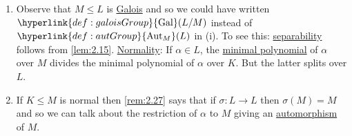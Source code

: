 \documentclass{article}
\DeclareMathOperator{\Aut}{Aut}
\DeclareMathOperator{\Gal}{Gal}
\begin{document}
\begin{remark}\leavevmode
    \begin{enumerate}[label=(\roman*)]
        \item Observe that $M \leq L$ is \hyperlink{def:galoisExt}{Galois} and so we could have written $\hyperlink{def:galoisGroup}{\Gal}(L/M)$ instead of $\hyperlink{def:autGroup}{\Aut_M}(L)$ in (i).
            To see this: \hyperlink{def:separableExt}{separability} follows from \cref{lem:2.15}.
            \hyperlink{def:normal}{Normality}: If $\alpha \in L$, the \hyperlink{def:minimalPoly}{minimal polynomial} of $\alpha$ over $M$ divides the minimal polynomial of $\alpha$ over $K$.
            But the latter splits over $L$.
        \item If $K \leq M$ is normal then \cref{rem:2.27} says that if $\sigma: L \to L$ then $\sigma(M) = M$ and so we can talk about the restriction of $\alpha$ to $M$ giving an \hyperlink{def:homo}{automorphism} of $M$.
    \end{enumerate}
\end{remark}
\end{document}
